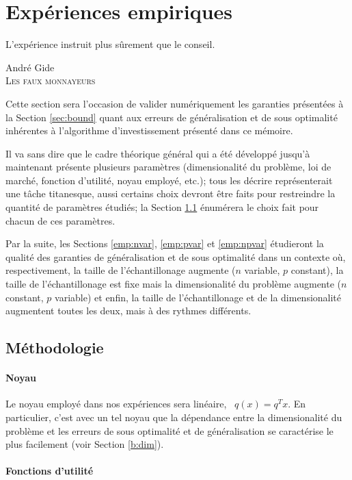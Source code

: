 \section{Expériences empiriques}
\label{sec:emp}

\epigraph{L'expérience instruit plus sûrement que le conseil.}{André Gide\\\textsc{Les faux
    monnayeurs}}

Cette section sera l'occasion de valider numériquement les garanties présentées à la
Section \ref{sec:bound} quant aux erreurs de généralisation et de sous optimalité
inhérentes à l'algorithme d'investissement présenté dans ce mémoire.

Il va sans dire que le cadre théorique général qui a été développé jusqu'à maintenant
présente plusieurs paramètres (dimensionalité du problème, loi de marché, fonction
d'utilité, noyau employé, etc.); tous les décrire représenterait une tâche titanesque,
aussi certains choix devront être faits pour restreindre la quantité de paramètres
étudiés; la Section \ref{emp:metho} énumérera le choix fait pour chacun de ces paramètres.

Par la suite, les Sections \ref{emp:nvar}, \ref{emp:pvar} et \ref{emp:npvar} étudieront la
qualité des garanties de généralisation et de sous optimalité dans un contexte où,
respectivement, la taille de l'échantillonage augmente ($n$ variable, $p$ constant), la
taille de l'échantillonage est fixe mais la dimensionalité du problème augmente ($n$
constant, $p$ variable) et enfin, la taille de l'échantillonage et de la dimensionalité
augmentent toutes les deux, mais à des rythmes différents.


\subsection{Méthodologie}
\label{emp:metho}

\paragraph{Noyau}

Le noyau employé dans nos expériences sera linéaire, \ie\ $q(x) = q^Tx$. En particulier,
c'est avec un tel noyau que la dépendance entre la dimensionalité du problème et les
erreurs de sous optimalité et de généralisation se caractérise le plus facilement (voir
Section \ref{b:dim}).

\paragraph{Fonctions d'utilité}

